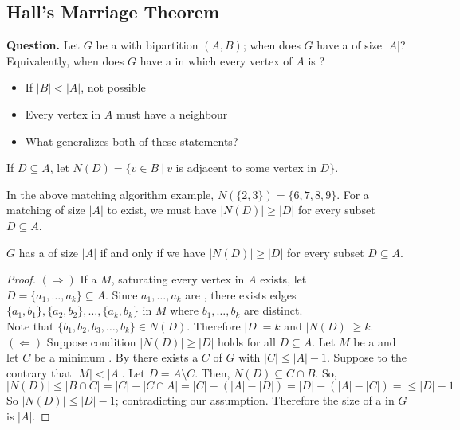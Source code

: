 \documentclass[english, 11pt]{article}
\begin{document}
\subsection{Hall's Marriage Theorem}

\textbf{Question.} Let $G$ be a   with bipartition $(A,B)$; when does $G$ have a  of size $|A|$? Equivalently, when does $G$ have a  in which every vertex of $A$ is ?
\begin{itemize}
  \item If $|B| < |A|$, not possible
  \item Every vertex in $A$ must have a neighbour
  \item What generalizes both of these statements?
\end{itemize}
If $D \subseteq A$, let $N(D) = \{v \in B \ | \ v$ is adjacent to some vertex in $D \}$.

\begin{exmp}
  In the above matching algorithm example, $N(\{2,3\}) = \{6,7,8,9\}$. For a matching of size $|A|$ to exist, we must have $|N(D)| \geq |D|$ for every subset $D \subseteq A$.
\end{exmp}
\begin{thrm}\label{hallsmarriage}
$G$ has a  of size $|A|$ if and only if we have $|N(D)| \geq |D|$ for every subset $D \subseteq A$.
\end{thrm}
\begin{proof}
  $(\Rightarrow)$ If a  $M$, saturating every vertex in $A$ exists, let $D = \{a_1, \ldots, a_k\} \subseteq A$. Since $a_1, \ldots, a_k$ are , there exists edges $\{a_1,b_1\}, \{a_2,b_2\},\ldots,\{a_k,b_k\}$ in $M$ where $b_1, \ldots, b_k$ are distinct. \\ Note that $\{b_1, b_2, b_3, \ldots, b_k\} \in N(D)$. Therefore $|D| = k$ and $|N(D)| \geq k$. \\

  $(\Leftarrow)$ Suppose condition $|N(D)| \geq |D|$ holds for all $D \subseteq A$. Let $M$ be a   and let $C$ be a minimum . By  there exists a  $C$ of $G$ with $|C| \leq |A| - 1$. Suppose to the contrary that $|M| < |A|$. Let $D = A \setminus C$. Then, $N(D) \subseteq C \cap B$. So,
  \[ |N(D)| \leq |B \cap C| = |C| - |C\cap A| = |C| - (|A| - |D|) = |D| - (|A| - |C|) =\leq |D| - 1\]
  So $|N(D)| \leq |D| - 1$; contradicting our assumption. Therefore the  size of a  in $G$ is $|A|$.
\end{proof}
\end{document}
